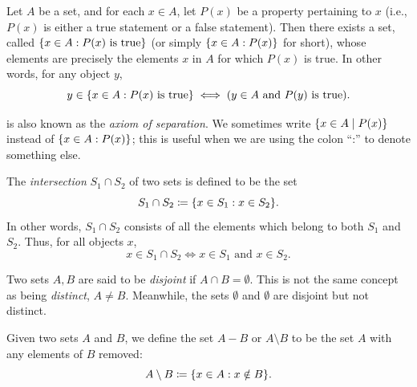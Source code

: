 \begin{ax}\label{i:3.5}
  Let \(A\) be a set, and for each \(x \in A\), let \(P(x)\) be a property pertaining to \(x\) (i.e., \(P(x)\) is either a true statement or a false statement).
  Then there exists a set, called \(\left\lbrace x \in A : P(x) \text{ is true}\right\rbrace\) (or simply \(\left\lbrace x \in A : P(x)\right\rbrace\) for short), whose elements are precisely the elements \(x\) in \(A\) for which \(P(x)\) is true.
  In other words, for any object \(y\),
  \[
    y \in \left\lbrace x \in A : P(x) \text{ is true}\right\rbrace \iff (y \in A \text{ and } P(y) \text{ is true}).
  \]
\end{ax}

\begin{note}
   is also known as the \emph{axiom of separation}.
  We sometimes write \(\left\lbrace x \in A \mid P(x)\right\rbrace\) instead of \(\left\lbrace x \in A : P(x)\right\rbrace\);
  this is useful when we are using the colon ``:'' to denote something else.
\end{note}

\setcounter{thm}{22}
\begin{defn}[Intersections]\label{i:3.1.23}
  The \emph{intersection} \(S_1 \cap S_2\) of two sets is defined to be the set
  \[
    S_1 \cap S_2 \coloneqq \set{x \in S_1 : x \in S_2}.
  \]
  In other words, \(S_1 \cap S_2\) consists of all the elements which belong to both \(S_1\) and \(S_2\).
  Thus, for all objects \(x\),
  \[
    x \in S_1 \cap S_2 \iff x \in S_1 \text{ and } x \in S_2.
  \]
\end{defn}

\begin{note}
  Two sets \(A, B\) are said to be \emph{disjoint} if \(A \cap B = \emptyset\).
  This is not the same concept as being \emph{distinct}, \(A \neq B\).
  Meanwhile, the sets \(\emptyset\) and \(\emptyset\) are disjoint but not distinct.
\end{note}

\setcounter{thm}{26}
\begin{defn}\label{i:3.1.27}
  Given two sets \(A\) and \(B\), we define the set \(A - B\) or \(A \setminus B\) to be the set \(A\) with any elements of \(B\) removed:
  \[
    A \setminus B \coloneqq \set{x \in A : x \notin B}.
  \]
\end{defn}

